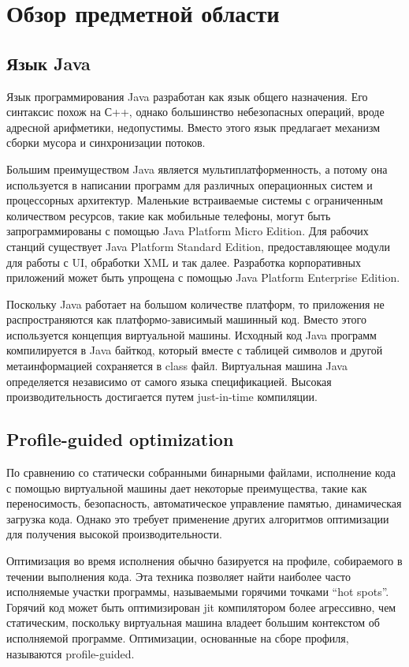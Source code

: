 
\section{Обзор предметной области} \label{view}

\subsection{Язык Java} \label{Java}
Язык программирования Java разработан как язык общего назначения. Его синтаксис похож на С++, однако большинство небезопасных операций, вроде адресной арифметики, недопустимы. Вместо этого язык предлагает механизм сборки мусора и синхронизации потоков.
\par
Большим преимуществом Java является мультиплатформенность, а потому она используется в написании программ для различных операционных систем и процессорных архитектур. 
Маленькие встраиваемые системы с ограниченным количеством ресурсов, такие как мобильные телефоны, могут быть запрограммированы с помощью Java Platform Micro Edition. Для рабочих станций существует Java Platform Standard Edition, предоставляющее модули для работы с UI, обработки XML и так далее. Разработка корпоративных приложений может быть упрощена с помощью Java Platform Enterprise Edition.
\par
Поскольку Java работает на большом количестве платформ, то приложения не распространяются как платформо-зависимый машинный код. Вместо этого используется концепция виртуальной машины. Исходный код Java программ компилируется в Java байткод, который вместе с таблицей символов и другой метаинформацией сохраняется в class файл.  Виртуальная машина Java определяется независимо от самого языка спецификацией\cite{java-spec}. Высокая производительность достигается путем just-in-time компиляции. 

\subsection{Profile-guided optimization} \label{pgo}
По сравнению со статически собранными бинарными файлами, исполнение кода с помощью виртуальной машины дает некоторые преимущества, такие как переносимость, безопасность, автоматическое управление памятью, динамическая загрузка кода. Однако это требует применение других алгоритмов оптимизации для получения высокой производительности.
\par
Оптимизация во время исполнения обычно базируется на профиле, собираемого в течении выполнения кода. 
Эта техника позволяет найти наиболее часто исполняемые участки программы, называемыми горячими точками “hot spots”. Горячий код может быть оптимизирован jit компилятором более агрессивно, чем статическим, поскольку виртуальная машина владеет большим контекстом об исполняемой программе. Оптимизации, основанные на сборе профиля, называются profile-guided.

